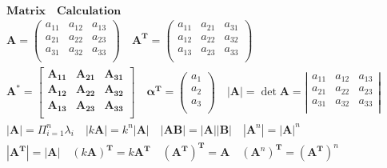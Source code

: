 \documentclass{article}
\begin{document}
\begin{align*}
    \bm{Matrix \quad Calculation} \\  
    \mathbf{A} = \left(
        \begin{array}{ccc}
            a_{11} & a_{12} & a_{13} \\ 
            a_{21} & a_{22} & a_{23} \\ 
            a_{31} & a_{32} & a_{33} \\  
        \end{array}
    \right) \quad \mathbf{A^{T}} = \left(
        \begin{array}{ccc}
            a_{11} & a_{21} & a_{31} \\ 
            a_{12} & a_{22} & a_{32} \\ 
            a_{13} & a_{23} & a_{33} \\  
        \end{array}
    \right) \\
    \mathbf{A^{*}} = \begin{bmatrix} 
        \mathbf{A_{11}} & \mathbf{A_{21}} & \mathbf{A_{31}} \\ 
        \mathbf{A_{12}} & \mathbf{A_{22}} & \mathbf{A_{32}} \\ 
        \mathbf{A_{13}} & \mathbf{A_{23}} & \mathbf{A_{33}} \\  
    \end{bmatrix} 
    \quad 
    \mathbf{\alpha^{T}} = \left(
        \begin{array}{c}
            a_{1} \\
            a_{2} \\  
            a_{3} \\ 
         \end{array}
    \right) \quad 
    |\mathbf{A}| =\det \mathbf{A} = \left|
    \begin{array}{ccc}
        a_{11} & a_{12} & a_{13} \\ 
        a_{21} & a_{22} & a_{23} \\ 
        a_{31} & a_{32} & a_{33} \\  
    \end{array}
    \right| \\ 
    |\mathbf{A}| = \Pi_{i=1}^n{\lambda_{i}} \quad |k \mathbf{A}| = k^{n}|\mathbf{A}| \quad |\mathbf{A}\mathbf{B}|=|\mathbf{A}||\mathbf{B}| \quad |\mathbf{A}^{n}|=|\mathbf{A}|^{n}\\
    |\mathbf{A}^{\mathbf{T}}| = |\mathbf{A}| \quad (k\mathbf{A})^{\mathbf{T}} = k\mathbf{A}^{\mathbf{T}} \quad (\mathbf{A}^{\mathbf{T}})^{\mathbf{T}} = \mathbf{A} \quad (\mathbf{A}^{n})^{\mathbf{T}} = (\mathbf{A}^{\mathbf{T}})^{n}\\  

\end{align*}
\end{document}

